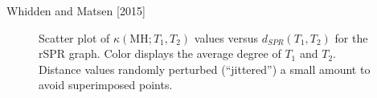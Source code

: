 \documentclass{beamer}
\theoremstyle{example}
\begin{document}
\begin{frame}{Whidden and Matsen [2015]}
\begin{figure}
    \caption{\small Scatter plot of $\kappa(\mathrm{MH}; T_1,T_2)$ values versus $d_{SPR}(T_1,T_2)$ for the rSPR graph. Color displays the average degree of $T_1$ and $T_2$. Distance values randomly perturbed (``jittered'') a small amount to avoid superimposed points.}
\end{figure}
\end{frame}
\end{document}
